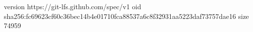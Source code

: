 version https://git-lfs.github.com/spec/v1
oid sha256:fc69623cf60c36bec14b4e01710fca88537a6c8f32931aa5223daf73757dae16
size 74959
